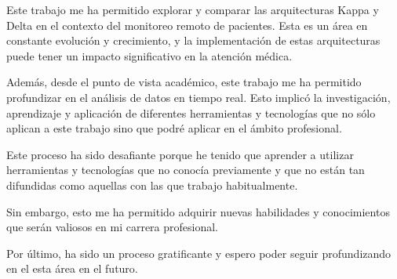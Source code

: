 Este trabajo me ha permitido explorar y comparar las arquitecturas Kappa y Delta en el contexto del monitoreo remoto de pacientes.
Esta es un área en constante evolución y crecimiento, y la implementación de estas arquitecturas puede tener un impacto significativo en la atención médica.\newline

Además, desde el punto de vista académico, este trabajo me ha permitido profundizar en el análisis de datos en tiempo real.
Esto implicó la investigación, aprendizaje y aplicación de diferentes herramientas y tecnologías que no sólo aplican 
a este trabajo sino que podré aplicar en el ámbito profesional.\newline

Este proceso ha sido desafiante porque he tenido que aprender a utilizar herramientas y tecnologías que no conocía previamente 
y que no están tan difundidas como aquellas con las que trabajo habitualmente.\newline

Sin embargo, esto me ha permitido adquirir nuevas habilidades y conocimientos que serán valiosos en mi carrera profesional.\newline

Por último, ha sido un proceso gratificante y espero poder seguir profundizando en el esta área en el futuro.